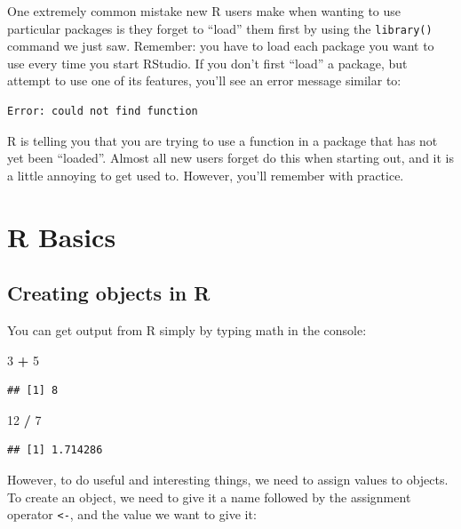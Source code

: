 \documentclass[]{book}
\newenvironment{Shaded}{\begin{snugshade}}{\end{snugshade}}
\newcommand{\DecValTok}[1]{\textcolor[rgb]{0.00,0.00,0.81}{#1}}
\newcommand{\OperatorTok}[1]{\textcolor[rgb]{0.81,0.36,0.00}{\textbf{#1}}}
\newcommand{\StringTok}[1]{\textcolor[rgb]{0.31,0.60,0.02}{#1}}
\begin{document}
One extremely common mistake new R users make when wanting to use particular packages is they forget to ``load'' them first by using the \texttt{library()} command we just saw. Remember: you have to load each package you want to use every time you start RStudio. If you don't first ``load'' a package, but attempt to use one of its features, you'll see an error message similar to:

\begin{verbatim}
Error: could not find function
\end{verbatim}

R is telling you that you are trying to use a function in a package that has not yet been ``loaded''. Almost all new users forget do this when starting out, and it is a little annoying to get used to. However, you'll remember with practice.

\hypertarget{r-basics}{%
\chapter{R Basics}\label{r-basics}}

\hypertarget{creating-objects-in-r}{%
\section{Creating objects in R}\label{creating-objects-in-r}}

You can get output from R simply by typing math in the console:

\begin{Shaded}
\begin{Highlighting}[]
\DecValTok{3} \OperatorTok{+}\StringTok{ }\DecValTok{5}
\end{Highlighting}
\end{Shaded}

\begin{verbatim}
## [1] 8
\end{verbatim}

\begin{Shaded}
\begin{Highlighting}[]
\DecValTok{12} \OperatorTok{/}\StringTok{ }\DecValTok{7}
\end{Highlighting}
\end{Shaded}

\begin{verbatim}
## [1] 1.714286
\end{verbatim}

However, to do useful and interesting things, we need to assign values to objects. To create an object, we need to give it a name followed by the assignment operator \texttt{\textless{}-}, and the value we want to give it:
\end{document}
